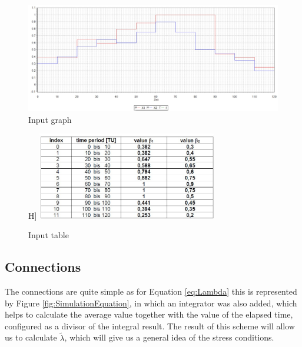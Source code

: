 \documentclass{article}
\begin{document}
\begin{doublespacing}
\begin{figure}[H] 
    \centering
    \includegraphics[width=1.0\textwidth]{Images/InputGraph.JPG} 
    \caption{Input graph} 
    \label{fig:InputGraph} 
\end{figure}

\begin{figure}H] 
    \centering
    \includegraphics[width=0.7\textwidth]{Images/InputTable.JPG} 
    \caption{Input table} 
    \label{fig:InputTable} 
\end{figure}


\vspace{10mm}

\subsection{Connections}

\par The connections are quite simple as for Equation \ref{eq:Lambda} this is represented by Figure \ref{fig:SimulationEquation}, in which an integrator was also added, which helps to calculate the average value together with the value of the elapsed time, configured as a divisor of the integral result. The result of this scheme will allow us to calculate $\tilde{\lambda}$, which will give us a general idea of the stress conditions.


\end{doublespacing}
\end{document}
